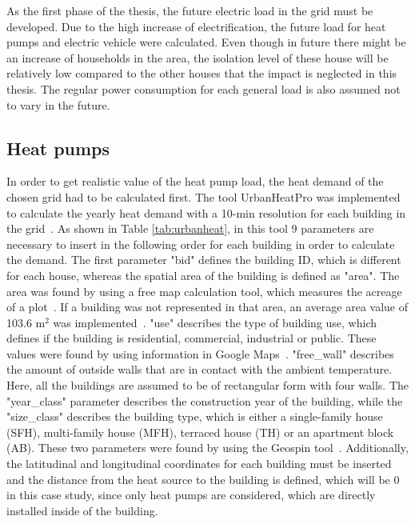 As the first phase of the thesis, the future electric load in the grid must be developed. Due to the high increase of electrification, the future load for heat pumps and electric vehicle were calculated. Even though in future there might be an increase of households in the area, the isolation level of these house will be relatively low compared to the other houses that the impact is neglected in this thesis. The regular power consumption for each general load is also assumed not to vary in the future. 

\subsection{Heat pumps}
 
In order to get realistic value of the heat pump load, the heat demand of the chosen grid had to be calculated first. The tool UrbanHeatPro was implemented to calculate the yearly heat demand with a 10-min resolution for each building in the grid~\cite{urbanheatpro}. As shown in Table \ref{tab:urbanheat}, in this tool 9 parameters are necessary to insert in the following order for each building in order to calculate the demand. The first parameter "bid" defines the building ID, which is different for each house, whereas the spatial area of the building is defined as "area". The area was found by using a free map calculation tool, which measures the acreage of a plot~\cite{maparea}. If a building was not represented in that area, an average area value of 103.6 m$^2$ was implemented~\cite{area}. "use" describes the type of building use, which defines if the building is residential, commercial, industrial or public. These values were found by using information in Google Maps~\cite{google}. "free\_wall" describes the amount of outside walls that are in contact with the ambient temperature. Here, all the buildings are assumed to be of rectangular form with four walls. The "year\_class" parameter describes the construction year of the building, while the "size\_class" describes the building type, which is either a single-family house (SFH), multi-family house (MFH), terraced house (TH) or an apartment block (AB). These two parameters were found by using the Geospin tool~\cite{geospin}. Additionally, the latitudinal and longitudinal coordinates for each building must be inserted and the distance from the heat source to the building is defined, which will be 0 in this case study, since only heat pumps are considered, which are directly installed inside of the building. 

